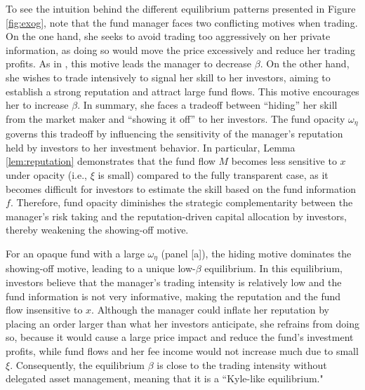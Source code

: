 To see the intuition behind the different equilibrium patterns presented in Figure \ref{fig:exog}, note that the fund manager faces two conflicting motives when trading. On the one hand, she seeks to avoid trading too aggressively on her private information, as doing so would move the price excessively and reduce her trading profits. As in \citet{kyle1985continuous}, this motive leads the manager to decrease $\beta$. On the other hand, she wishes to trade intensively to signal her skill to her investors, aiming to establish a strong reputation and attract large fund flows. This motive encourages her to increase $\beta$. In summary, she faces a tradeoff between ``hiding'' her skill from the market maker and ``showing it off'' to her investors. The fund opacity $\omega_{\eta}$ governs this tradeoff by influencing the sensitivity of the manager's reputation held by investors to her investment behavior. In particular, Lemma \ref{lem:reputation} demonstrates that the fund flow $M$ becomes less sensitive to $x$ under opacity (i.e., $\xi$ is small) compared to the fully transparent case, as it becomes difficult for investors to estimate the skill based on the fund information $f$. Therefore, fund opacity diminishes the strategic complementarity between the manager's risk taking and the reputation-driven capital allocation by investors, thereby weakening the showing-off motive.

For an opaque fund with a large $\omega_{\eta}$ (panel [a]), the hiding motive dominates the showing-off motive, leading to a unique low-$\beta$ equilibrium. In this equilibrium, investors believe that the manager's trading intensity is relatively low and the fund information is not very informative, making the reputation and the fund flow insensitive to $x$. Although the manager could inflate her reputation by placing an order larger than what her investors anticipate, she refrains from doing so, because it would cause a large price impact and reduce the fund's investment profits, while fund flows and her fee income would not increase much due to small $\xi$. Consequently, the equilibrium $\beta$ is close to the trading intensity without delegated asset management, meaning that it is a ``Kyle-like equilibrium." 

